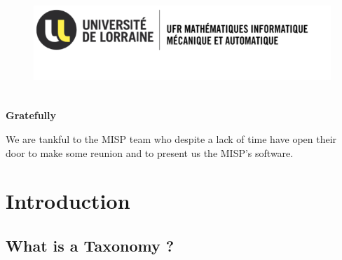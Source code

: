 \documentclass[12pt]{report}
\affiliation{
    \affil{1    }Université de Lorraine\\
    UFR MIM\\
    3 Rue Augustin Fresnel, 57070 Metz\\
    marwin.nimeskern5@etu.univ-lorraine.fr\\
  
    \affil{2    }Université de Lorraine\\
    UFR MIM\\
    3 Rue Augustin Fresnel, 57070 Metz\\
    gregory.guggenbuhl7@etu.univ-lorraine.fr\\

    \affil{3   }Université de Lorraine\\
    UFR MIM\\
    3 Rue Augustin Fresnel, 57070 Metz\\
    jules.charron5@etu.univ-lorraine.fr\\
}
\begin{document}
\vspace{\baselineskip}
\vspace{\baselineskip}
\vspace{\baselineskip}
\vspace{\baselineskip}
\vspace{\baselineskip}
\vspace{\baselineskip}
\vspace{\baselineskip}
\begin{figure}[H]
	\begin{Center}
		\includegraphics[width=6.3in,height=1.57in]{./media/image1.png}
	\end{Center}
\end{figure}



\newpage

{\fontsize{22pt}{26.4pt}\selectfont \textbf{\textcolor[HTML]{2E74B5}{Gratefully}}\par}\par
\vspace{\baselineskip}
We are tankful to the MISP team who despite a lack of time have open their door to make some reunion and to present us the MISP’s software. \par


\newpage


\tableofcontents
{}

\newpage

\section*{Introduction}
\subsection*{What is a Taxonomy ?}
\end{document}
